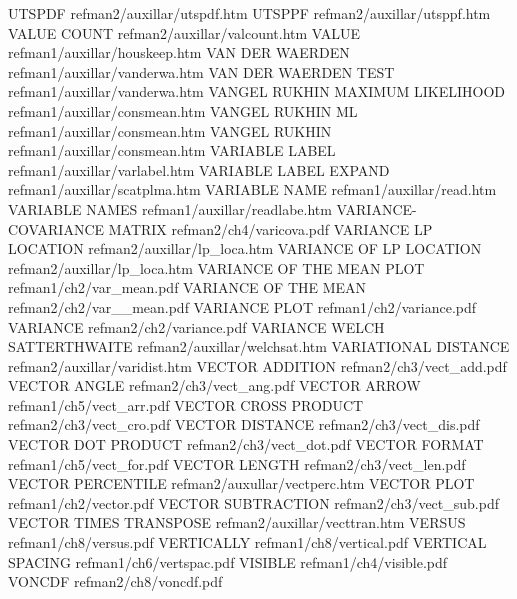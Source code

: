 UTSPDF                                  refman2/auxillar/utspdf.htm
UTSPPF                                  refman2/auxillar/utsppf.htm
VALUE COUNT                             refman2/auxillar/valcount.htm
VALUE                                   refman1/auxillar/houskeep.htm
VAN DER WAERDEN                         refman1/auxillar/vanderwa.htm
VAN DER WAERDEN TEST                    refman1/auxillar/vanderwa.htm
VANGEL RUKHIN MAXIMUM LIKELIHOOD        refman1/auxillar/consmean.htm
VANGEL RUKHIN ML                        refman1/auxillar/consmean.htm
VANGEL RUKHIN                           refman1/auxillar/consmean.htm
VARIABLE LABEL                          refman1/auxillar/varlabel.htm
VARIABLE LABEL EXPAND                   refman1/auxillar/scatplma.htm
VARIABLE NAME                           refman1/auxillar/read.htm
VARIABLE NAMES                          refman1/auxillar/readlabe.htm
VARIANCE-COVARIANCE MATRIX              refman2/ch4/varicova.pdf
VARIANCE LP LOCATION                    refman2/auxillar/lp_loca.htm
VARIANCE OF LP LOCATION                 refman2/auxillar/lp_loca.htm
VARIANCE OF THE MEAN PLOT               refman1/ch2/var_mean.pdf
VARIANCE OF THE MEAN                    refman2/ch2/var__mean.pdf
VARIANCE PLOT                           refman1/ch2/variance.pdf
VARIANCE                                refman2/ch2/variance.pdf
VARIANCE WELCH SATTERTHWAITE            refman2/auxillar/welchsat.htm
VARIATIONAL DISTANCE                    refman2/auxillar/varidist.htm
VECTOR ADDITION                         refman2/ch3/vect_add.pdf
VECTOR ANGLE                            refman2/ch3/vect_ang.pdf
VECTOR ARROW                            refman1/ch5/vect_arr.pdf
VECTOR CROSS PRODUCT                    refman2/ch3/vect_cro.pdf
VECTOR DISTANCE                         refman2/ch3/vect_dis.pdf
VECTOR DOT PRODUCT                      refman2/ch3/vect_dot.pdf
VECTOR FORMAT                           refman1/ch5/vect_for.pdf
VECTOR LENGTH                           refman2/ch3/vect_len.pdf
VECTOR PERCENTILE                       refman2/auxullar/vectperc.htm
VECTOR PLOT                             refman1/ch2/vector.pdf
VECTOR SUBTRACTION                      refman2/ch3/vect_sub.pdf
VECTOR TIMES TRANSPOSE                  refman2/auxillar/vecttran.htm
VERSUS                                  refman1/ch8/versus.pdf
VERTICALLY                              refman1/ch8/vertical.pdf
VERTICAL SPACING                        refman1/ch6/vertspac.pdf
VISIBLE                                 refman1/ch4/visible.pdf
VONCDF                                  refman2/ch8/voncdf.pdf
